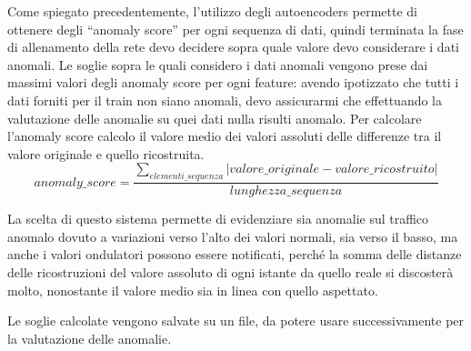 Come spiegato precedentemente, l'utilizzo degli autoencoders permette di ottenere degli ``anomaly score'' per ogni sequenza di dati, quindi terminata la fase di allenamento della rete devo decidere sopra quale valore devo considerare i dati anomali.
Le soglie sopra le quali considero i dati anomali vengono prese dai massimi valori degli anomaly score per ogni feature: avendo ipotizzato che tutti i dati forniti per il train non siano anomali, devo assicurarmi che effettuando la valutazione delle anomalie su quei dati nulla risulti anomalo.
Per calcolare l'anomaly score calcolo il valore medio dei valori assoluti delle differenze tra il valore originale e quello ricostruita.
\begin{equation}
    anomaly\_score = \frac{\sum_{elementi\_sequenza}\lvert valore\_originale - valore\_ricostruito \rvert}{lunghezza\_sequenza}
\end{equation}

La scelta di questo sistema permette di evidenziare sia anomalie sul traffico anomalo dovuto a variazioni verso l'alto dei valori normali, sia verso il basso, ma anche i valori ondulatori possono essere notificati, perché la somma delle distanze delle ricostruzioni del valore assoluto di ogni istante da quello reale si discosterà molto, nonostante il valore medio sia in linea con quello aspettato.

Le soglie calcolate vengono salvate su un file, da potere usare successivamente per la valutazione delle anomalie.








